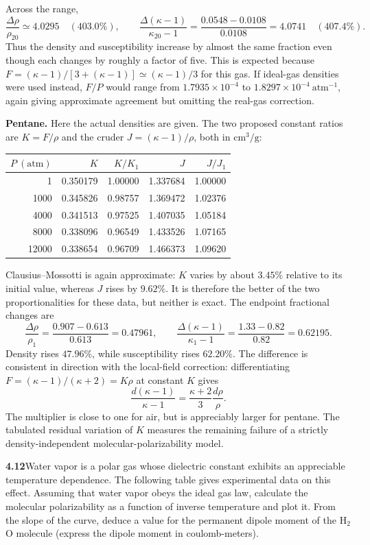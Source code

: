 Across the range,
\[
\frac{\Delta\rho}{\rho_{20}}\simeq4.0295\quad(403.0\%),\qquad
\frac{\Delta(\kappa-1)}{\kappa_{20}-1}
=\frac{0.0548-0.0108}{0.0108}=4.0741\quad(407.4\%).
\]
Thus the density and susceptibility increase by almost the same
fraction even though each changes by roughly a factor of five.
This is expected because
$F=(\kappa-1)/[3+(\kappa-1)]\simeq(\kappa-1)/3$ for this gas.
If ideal-gas densities were used instead, $F/P$ would range from
$1.7935\times10^{-4}$ to $1.8297\times10^{-4}\ \mathrm{atm}^{-1}$,
again giving approximate agreement but omitting the real-gas correction.

\textbf{Pentane.} Here the actual densities are given. The two proposed
constant ratios are $K=F/\rho$ and the cruder
$J=(\kappa-1)/\rho$, both in $\mathrm{cm^3/g}$:
\begin{center}
\begin{tabular}{rrrrr}
\toprule
$P\ (\mathrm{atm})$ & $K$ & $K/K_1$ & $J$ & $J/J_1$\\
\midrule
1     & 0.350179 & 1.00000 & 1.337684 & 1.00000\\
1000  & 0.345826 & 0.98757 & 1.369472 & 1.02376\\
4000  & 0.341513 & 0.97525 & 1.407035 & 1.05184\\
8000  & 0.338096 & 0.96549 & 1.433526 & 1.07165\\
12000 & 0.338654 & 0.96709 & 1.466373 & 1.09620\\
\bottomrule
\end{tabular}
\end{center}
Clausius--Mossotti is again approximate: $K$ varies by about $3.45\%$
relative to its initial value, whereas $J$ rises by $9.62\%$.
It is therefore the better of the two proportionalities for these data,
but neither is exact. The endpoint fractional changes are
\[
\frac{\Delta\rho}{\rho_1}=\frac{0.907-0.613}{0.613}=0.47961,
\qquad
\frac{\Delta(\kappa-1)}{\kappa_1-1}
=\frac{1.33-0.82}{0.82}=0.62195.
\]
Density rises $47.96\%$, while susceptibility rises $62.20\%$.
The difference is consistent in direction with the local-field
correction: differentiating $F=(\kappa-1)/(\kappa+2)=K\rho$ at constant
$K$ gives
\[
\frac{d(\kappa-1)}{\kappa-1}
=\frac{\kappa+2}{3}\frac{d\rho}{\rho}.
\]
The multiplier is close to one for air, but is appreciably larger for
pentane. The tabulated residual variation of $K$ measures the remaining
failure of a strictly density-independent molecular-polarizability model.

\par\bigskip
\noindent\textbf{4.12}\quad Water vapor is a polar gas whose dielectric constant exhibits an appreciable temperature dependence. The following table gives experimental data on this effect. Assuming that water vapor obeys the ideal gas law, calculate the molecular polarizability as a function of inverse temperature and plot it. From the slope of the curve, deduce a value for the permanent dipole moment of the H$_{2}$O molecule (express the dipole moment in coulomb-meters).


